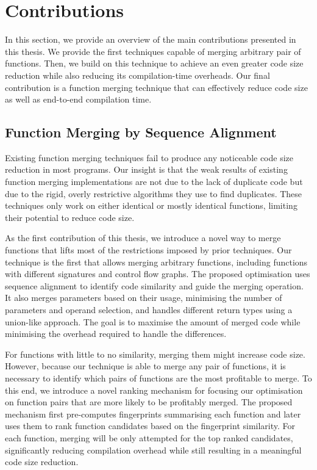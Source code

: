 \section{Contributions}

In this section, we provide an overview of the main contributions presented in this thesis.
We provide the first techniques capable of merging arbitrary pair of functions.
Then, we build on this technique to achieve an even greater code size reduction while also reducing its compilation-time overheads.
Our final contribution is a function merging technique that can effectively reduce code size as well as end-to-end compilation time.

\subsection{Function Merging by Sequence Alignment}


Existing function merging techniques fail to produce any noticeable code size reduction in most programs.
Our insight is that the weak results of existing function merging implementations are not due to the lack of duplicate code but due to the rigid, overly restrictive algorithms they use to find duplicates.
These techniques only work on either identical or mostly identical functions, limiting their potential to reduce code size.

As the first contribution of this thesis, we introduce a novel way to merge functions that lifts most of the restrictions imposed by prior techniques.
Our technique is the first that allows merging arbitrary functions, including functions with different signatures and control flow graphs.
The proposed optimisation uses sequence alignment to identify code similarity and guide the merging operation.
It also merges parameters based on their usage, minimising the number of parameters and operand selection, and handles different return types using a union-like approach.
The goal is to maximise the amount of merged code while minimising the overhead required to handle the differences.

For functions with little to no similarity, merging them might increase code size.
However, because our technique is able to merge any pair of functions, it is necessary to identify which pairs of functions are the most profitable to merge.
To this end, we introduce a novel ranking mechanism for focusing our optimisation on function pairs that are more likely to be profitably merged.
The proposed mechanism first pre-computes fingerprints summarising each function and later uses them to rank function candidates based on the fingerprint similarity.
For each function, merging will be only attempted for the top ranked candidates, significantly reducing compilation overhead while still resulting in a meaningful code size reduction.

